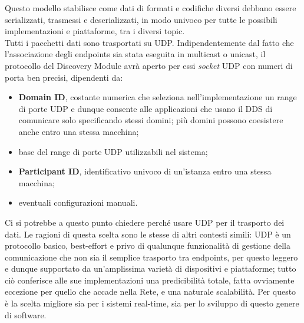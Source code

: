 \indent Questo modello stabilisce come dati di formati e codifiche diversi debbano essere serializzati, trasmessi e deserializzati, in modo univoco per tutte le possibili implementazioni e piattaforme, tra i diversi topic.\\
Tutti i pacchetti dati sono trasportati su UDP. Indipendentemente dal fatto che l’associazione degli endpoints sia stata eseguita in multicast o unicast, il protocollo del Discovery Module avrà aperto per essi \emph{socket} UDP con numeri di porta ben precisi, dipendenti da:
\begin{itemize}
    \item \textbf{Domain ID}, costante numerica che seleziona nell'implementazione un range di porte UDP e dunque consente alle applicazioni che usano il DDS di comunicare solo specificando stessi domini; più domini possono coesistere anche entro una stessa macchina;
    \item base del range di porte UDP utilizzabili nel sistema;
    \item \textbf{Participant ID}, identificativo univoco di un'istanza entro una stessa macchina;
    \item eventuali configurazioni manuali.
\end{itemize}
Ci si potrebbe a questo punto chiedere perché usare UDP per il trasporto dei dati. Le ragioni di questa scelta sono le stesse di altri contesti simili: UDP è un protocollo basico, best-effort e privo di qualunque funzionalità di gestione della comunicazione che non sia il semplice trasporto tra endpoints, per questo leggero e dunque supportato da un'amplissima varietà di dispositivi e piattaforme; tutto ciò conferisce alle sue implementazioni una predicibilità totale, fatta ovviamente eccezione per quello che accade nella Rete, e una naturale scalabilità. Per questo è la scelta migliore sia per i sistemi real-time, sia per lo sviluppo di questo genere di software.\newpage

